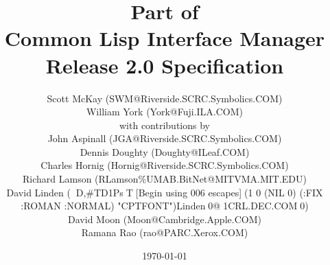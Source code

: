 
\pagestyle{headings}

\title{Part of \\
       Common Lisp Interface Manager \\
       Release 2.0 Specification}

\author{Scott McKay ({\tentt SWM@Riverside.SCRC.Symbolics.COM}) \\
        William York ({\tentt York@Fuji.ILA.COM}) \\ 
        {\tenit with contributions by} \\
        {\tenrm John Aspinall ({\tentt JGA@Riverside.SCRC.Symbolics.COM})} \\
        {\tenrm Dennis Doughty ({\tentt Doughty@ILeaf.COM})} \\
        {\tenrm Charles Hornig ({\tentt Hornig@Riverside.SCRC.Symbolics.COM})} \\
        {\tenrm Richard Lamson ({\tentt RLamson\%UMAB.BitNet@MITVMA.MIT.EDU})} \\
        {\tenrm David Linden ({\tentt D,#TD1PsT[Begin using 006 escapes](1 0 (NIL 0) (:FIX :ROMAN :NORMAL) "CPTFONT")Linden0@1CRL.DEC.COM0})} \\
        {\tenrm David Moon ({\tentt Moon@Cambridge.Apple.COM})} \\
        {\tenrm Ramana Rao ({\tentt rao@PARC.Xerox.COM})}}

\date{\today}




\newif \ifpsfig \psfigfalse

\addtolength{\oddsidemargin}{-.5in}
\addtolength{\evensidemargin}{-.5in}
\addtolength{\textwidth}{1in}
\addtolength{\topmargin}{-.5in}
\addtolength{\textheight}{1.0in}



\parindent 0pc
\parskip   1pc






